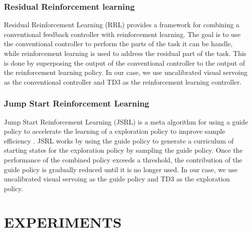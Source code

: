 \documentclass[letterpaper, 10 pt, conference]{ieeeconf}  %
\begin{document}
\subsubsection{Residual Reinforcement learning}

Residual Reinforcement Learning (RRL) provides a framework for combining a
conventional feedback controller with reinforcement learning. The goal is to use
the conventional controller to perform the parts of the task it can be handle,
while reinforcement learning is used to address the residual part of the task.
\cite{Johannink2018} This is done by superposing the output of the conventional
controller to the output of the reinforcement learning policy. In our case, we
use uncalibrated visual servoing as the conventional controller and TD3 as the
reinforcement learning controller.

\subsubsection{Jump Start Reinforcement Learning}

Jump Start Reinforcement Learning (JSRL) is a meta algorithm for using a guide policy to
accelerate the learning of a exploration policy to improve sample efficiency
\cite{Uchendu2022}. JSRL works by using the guide policy to generate a curriculum of
starting states for the exploration policy by sampling the guide policy. Once the
performance of the combined policy exceeds a threshold, the contribution of the guide
policy is gradually reduced until it is no longer used. In our case, we use uncalibrated
visual servoing as the guide policy and TD3 as the exploration policy.

\section{EXPERIMENTS} \label{Experiments}
\end{document}

